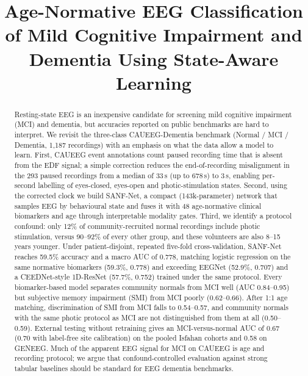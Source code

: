 \documentclass[conference]{IEEEtran}
\begin{document}
\title{Age-Normative EEG Classification of Mild Cognitive Impairment and Dementia Using State-Aware
Learning}

\author{
}

\maketitle

\begin{abstract}
Resting-state EEG is an inexpensive candidate for screening mild cognitive impairment (MCI) and
dementia, but accuracies reported on public benchmarks are hard to interpret. We revisit the
three-class CAUEEG-Dementia benchmark (Normal / MCI / Dementia, 1,187 recordings) with an emphasis
on what the data allow a model to learn. First, CAUEEG event annotations count paused recording time
that is absent from the EDF signal; a simple correction reduces the end-of-recording misalignment in
the 293 paused recordings from a median of 33\,s (up to 678\,s) to 3\,s, enabling per-second labelling
of eyes-closed, eyes-open and photic-stimulation states. Second, using the corrected clock we build
SANF-Net, a compact (143k-parameter) network that samples EEG by behavioural state and fuses it with
48 age-normative clinical biomarkers and age through interpretable modality gates. Third, we identify
a protocol confound: only 12\% of community-recruited normal recordings include photic stimulation,
versus 90--92\% of every other group, and these volunteers are also 8--15 years younger. Under
patient-disjoint, repeated five-fold cross-validation, SANF-Net reaches 59.5\% accuracy and a
macro AUC of 0.778, matching logistic regression on the same normative biomarkers
(59.3\%, 0.778) and exceeding EEGNet (52.9\%, 0.707) and a CEEDNet-style 1D-ResNet (57.7\%, 0.752) trained under the
same protocol. Every biomarker-based model separates community normals from MCI well (AUC 0.84--0.95) but subjective
memory impairment (SMI) from MCI poorly (0.62--0.66). After 1:1 age matching, discrimination of SMI from
MCI falls to 0.54--0.57, and community normals with the same photic protocol as MCI are not
distinguished from them at all (0.50--0.59). External testing without retraining gives an
MCI-versus-normal AUC of 0.67 (0.70 with label-free site calibration) on the pooled Isfahan cohorts and 0.58 on GENEEG. Much of the
apparent EEG signal for MCI on CAUEEG is age and recording protocol; we argue that confound-controlled
evaluation against strong tabular baselines should be standard for EEG dementia benchmarks.
\end{abstract}
\end{document}
